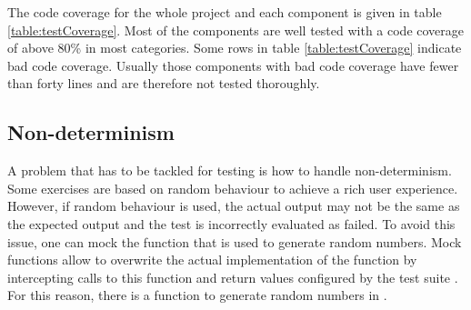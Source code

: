 The code coverage for the whole project and each component is given in table \ref{table:testCoverage}. Most of the components are well tested with a code coverage of above 80\% in most categories. Some rows in table \ref{table:testCoverage} indicate bad code coverage. Usually those components with bad code coverage have fewer than forty lines and are therefore not tested thoroughly. 
 
\subsection*{Non-determinism}
A problem that has to be tackled for testing is how to handle non-determinism. Some exercises are based on random behaviour to achieve a rich user experience. However, if random behaviour is used, the actual output may not be the same as the expected output and the test is incorrectly evaluated as failed. To avoid this issue, one can mock the function that is used to generate random numbers. Mock functions allow to overwrite the actual implementation of the function by intercepting calls to this function and return values configured by the test suite \cite{Jest}. For this reason, there is a function to generate random numbers in .


